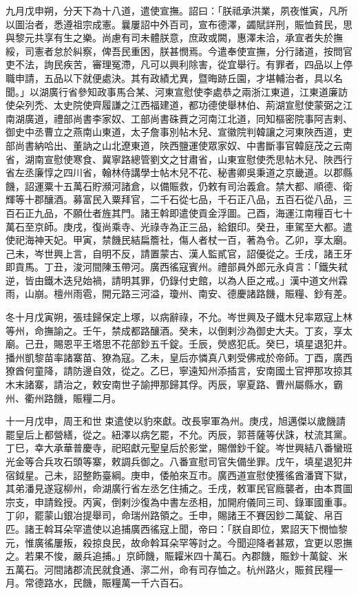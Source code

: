 \begin{pinyinscope}
 九月戊申朔，分天下為十八道，遣使宣撫。詔曰：「朕祗承洪業，夙夜惟寅，凡所以圖治者，悉遵祖宗成憲。曩屢詔中外百司，宣布德澤，蠲賦詳刑，賑恤貧民，思與黎元共享有生之樂。尚慮有司未體朕意，庶政或闕，惠澤未洽，承宣者失於撫綏，司憲者怠於糾察，俾吾民重困，朕甚憫焉。今遣奉使宣撫，分行諸道，按問官吏不法，詢民疾苦，審理冤滯，凡可以興利除害，從宜舉行。有罪者，四品以上停職申請，五品以下就便處決。其有政績尤異，暨晦跡丘園，才堪輔治者，具以名聞。」以湖廣行省參知政事馬合某、河東宣慰使李處恭之兩浙江東道，江東道廉訪使朵列禿、太史院使齊履謙之江西福建道，都功德使舉林伯、荊湖宣慰使蒙弼之江南湖廣道，禮部尚書李家奴、工部尚書硃蕡之河南江北道，同知樞密院事阿吉剌、御史中丞曹立之燕南山東道，太子詹事別帖木兒、宣徽院判韓讓之河東陜西道，吏部尚書納哈出、董訥之山北遼東道，陜西鹽運使眾家奴、中書斷事官韓庭茂之云南省，湖南宣慰使寒食、冀寧路總管劉文之甘肅省，山東宣慰使禿思帖木兒、陜西行省左丞廉惇之四川省，翰林侍講學士帖木兒不花、秘書卿吳秉道之京畿道。以郡縣饑，詔運粟十五萬石貯瀕河諸倉，以備賑救，仍敕有司治義倉。禁大都、順德、衛輝等十郡釀酒。募富民入粟拜官，二千石從七品，千石正八品，五百石從八品，三百石正九品，不願仕者旌其門。諸王斡即遣使貢金浮圖。己酉，海運江南糧百七十萬石至京師。庚戌，復尚乘寺、光祿寺為正三品，給銀印。癸丑，車駕至大都。遣使祀海神天妃。甲寅，禁饑民結扁簷社，傷人者杖一百，著為令。乙卯，享太廟。己未，岑世興上言，自明不反，請置蒙古、漢人監貳官，詔優從之。壬戌，諸王牙即貢馬。丁丑，浚河間陳玉帶河。廣西徭寇賓州。禮部員外郎元永貞言：「鐵失弒逆，皆由鐵木迭兒始禍，請明其罪，仍錄付史館，以為人臣之戒。」漢中道文州霖雨，山崩。檀州雨雹，開元路三河溢，瓊州、南安、德慶諸路饑，賑糧、鈔有差。



 冬十月戊寅朔，張珪歸保定上塚，以病辭祿，不允。岑世興及子鐵木兒率眾寇上林等州，命撫諭之。壬午，禁成都路釀酒。癸未，以倒剌沙為御史大夫。丁亥，享太廟。己丑，賜恩平王塔思不花部鈔五千錠。壬辰，熒惑犯氐。癸巳，填星退犯井。播州凱黎苗率諸寨苗、獠為寇。乙未，皇后亦憐真八剌受佛戒於帝師。丁酉，廣西獠酋何童降，請防邊自效，從之。乙巳，寧遠知州添插言，安南國土官押那攻掠其木末諸寨，請治之，敕安南世子諭押那歸其俘。丙辰，寧夏路、曹州屬縣水，霸州、衢州路饑，賑糧二月。



 十一月戊申，周王和世束遣使以豹來獻。改長寧軍為州。庚戌，旭邁傑以歲饑請罷皇后上都營繕，從之。紐澤以病乞罷，不允。丙辰，郭菩薩等伏誅，杖流其黨。丁巳，幸大承華普慶寺，祀昭獻元聖皇后於影堂，賜僧鈔千錠。岑世興結八番蠻班光金等合兵攻石頭等寨，敕調兵御之。八番宣慰司官失備坐罪。戊午，填星退犯井宿鉞星。己未，詔整飭臺綱。庚申，倭舶來互市。廣西道宣慰使獲徭酋潘寶下獄，其弟潘見遂寇柳州，命湖廣行省左丞乞住捕之。壬戌，敕軍民官廕襲者，由本貫圖宗支，申請銓授。丙寅，倒剌沙復為中書左丞相，加開府儀同三司、錄軍國重事。丁卯，罷蒙山銀冶提舉司，命瑞州路領之。壬申，賜諸王不賽因鈔二萬錠、帛百匹。諸王斡耳朵罕遣使以追捕廣西徭寇上聞，帝曰：「朕自即位，累詔天下憫恤黎元，惟廣徭屢叛，殺掠良民，故命斡耳朵罕等討之。今聞迎降者甚眾，宜更以恩撫之。若果不悛，嚴兵追捕。」京師饑，賑糶米四十萬石。內郡饑，賑鈔十萬錠、米五萬石。河間諸郡流民就食通、漷二州，命有司存恤之。杭州路火，賑貧民糧一月。常德路水，民饑，賑糧萬一千六百石。




\end{pinyinscope}

